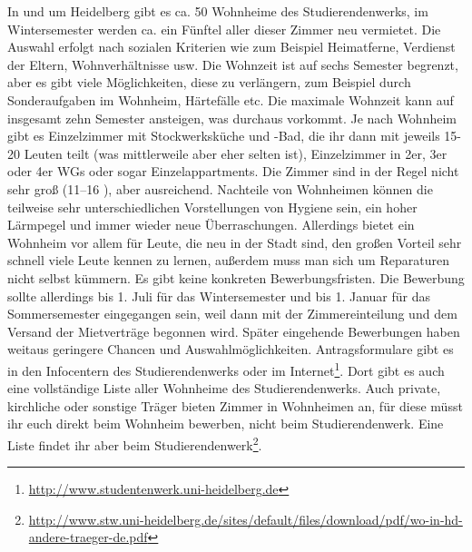 In und um Heidelberg gibt es ca. 50 Wohnheime des Studierendenwerks, im Wintersemester werden ca. ein Fünftel aller dieser Zimmer neu vermietet. Die Auswahl erfolgt nach sozialen Kriterien wie zum Beispiel Heimatferne, Verdienst der Eltern, Wohnverhältnisse usw. Die Wohnzeit ist auf sechs Semester begrenzt, aber es gibt viele Möglichkeiten, diese zu verlängern, zum Beispiel durch Sonderaufgaben im Wohnheim, Härtefälle etc. Die maximale Wohnzeit kann auf insgesamt zehn Semester ansteigen, was durchaus vorkommt. Je nach Wohnheim gibt es Einzelzimmer mit Stockwerksküche und -Bad, die ihr dann mit jeweils 15-20 Leuten teilt (was mittlerweile aber eher selten ist), Einzelzimmer in 2er, 3er oder 4er WGs oder sogar Einzelappartments. Die Zimmer sind in der Regel nicht sehr groß (11--16 \squaren\metre), aber ausreichend. Nachteile von Wohnheimen können die teilweise sehr unterschiedlichen Vorstellungen von Hygiene sein, ein hoher Lärmpegel und immer wieder neue Überraschungen. Allerdings bietet ein Wohnheim vor allem für Leute, die neu in der Stadt sind, den großen Vorteil sehr schnell viele Leute kennen zu lernen, außerdem muss man sich um Reparaturen nicht selbst kümmern. Es gibt keine konkreten Bewerbungsfristen. Die Bewerbung sollte allerdings bis 1. Juli für das Wintersemester und bis 1. Januar für das Sommersemester eingegangen sein, weil dann mit der Zimmereinteilung und dem Versand der Mietverträge begonnen wird. Später eingehende Bewerbungen haben weitaus geringere Chancen und Auswahlmöglichkeiten. Antragsformulare gibt es in den Infocentern des Studierendenwerks oder im Internet\footnote{\url{http://www.studentenwerk.uni-heidelberg.de}}. Dort gibt es auch eine vollständige Liste aller Wohnheime des Studierendenwerks. Auch private, kirchliche oder sonstige Träger bieten Zimmer in Wohnheimen an, für diese müsst ihr euch direkt beim Wohnheim bewerben, nicht beim Studierendenwerk. Eine Liste findet ihr aber beim Studierendenwerk\footnote{\url{http://www.stw.uni-heidelberg.de/sites/default/files/download/pdf/wo-in-hd-andere-traeger-de.pdf}}.
